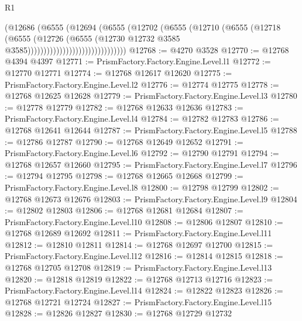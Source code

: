 \begin{lexlean}{R1}
\begin{coremodule}
                                        (@12686
                                          (@6555
                                            (@12694
                                              (@6555
                                                (@12702
                                                  (@6555
                                                    (@12710
                                                      (@6555
                                                        (@12718
                                                          (@6555
                                                            (@12726
                                                              (@6555
                                                                (@12730
                                                                  @12732
                                                                  @3585
                                                                  @3585)))))))))))))))))))))))))))))))
@12768 := @4270 @3528
@12770 := @12768 @4394 @4397
@12771 := PrismFactory.Factory.Engine.Level.l1
@12772 := @12770 @12771
@12774 := @12768 @12617 @12620
@12775 := PrismFactory.Factory.Engine.Level.l2
@12776 := @12774 @12775
@12778 := @12768 @12625 @12628
@12779 := PrismFactory.Factory.Engine.Level.l3
@12780 := @12778 @12779
@12782 := @12768 @12633 @12636
@12783 := PrismFactory.Factory.Engine.Level.l4
@12784 := @12782 @12783
@12786 := @12768 @12641 @12644
@12787 := PrismFactory.Factory.Engine.Level.l5
@12788 := @12786 @12787
@12790 := @12768 @12649 @12652
@12791 := PrismFactory.Factory.Engine.Level.l6
@12792 := @12790 @12791
@12794 := @12768 @12657 @12660
@12795 := PrismFactory.Factory.Engine.Level.l7
@12796 := @12794 @12795
@12798 := @12768 @12665 @12668
@12799 := PrismFactory.Factory.Engine.Level.l8
@12800 := @12798 @12799
@12802 := @12768 @12673 @12676
@12803 := PrismFactory.Factory.Engine.Level.l9
@12804 := @12802 @12803
@12806 := @12768 @12681 @12684
@12807 := PrismFactory.Factory.Engine.Level.l10
@12808 := @12806 @12807
@12810 := @12768 @12689 @12692
@12811 := PrismFactory.Factory.Engine.Level.l11
@12812 := @12810 @12811
@12814 := @12768 @12697 @12700
@12815 := PrismFactory.Factory.Engine.Level.l12
@12816 := @12814 @12815
@12818 := @12768 @12705 @12708
@12819 := PrismFactory.Factory.Engine.Level.l13
@12820 := @12818 @12819
@12822 := @12768 @12713 @12716
@12823 := PrismFactory.Factory.Engine.Level.l14
@12824 := @12822 @12823
@12826 := @12768 @12721 @12724
@12827 := PrismFactory.Factory.Engine.Level.l15
@12828 := @12826 @12827
@12830 := @12768 @12729 @12732

\end{coremodule}
\end{lexlean}
